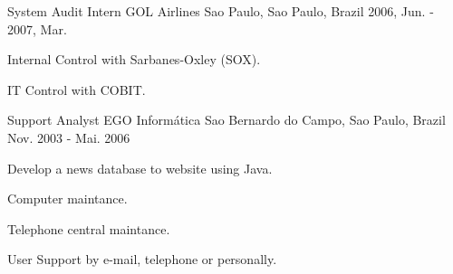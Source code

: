 \begin{cventries}
  \cventry
    {System Audit Intern} %
    {GOL Airlines} %
    {Sao Paulo, Sao Paulo, Brazil} %
    {2006, Jun. - 2007, Mar.} %
    {
      \begin{cvitems} %
        \item {Internal Control with Sarbanes-Oxley (SOX).}
        \item {IT Control with COBIT.}
      \end{cvitems}
    }

  \cventry
    {Support Analyst} %
    {EGO Informática} %
    {Sao Bernardo do Campo, Sao Paulo, Brazil} %
    {Nov. 2003 - Mai. 2006} %
    {
      \begin{cvitems} %
        \item {Develop a news database to website using Java.}
        \item {Computer maintance.}
        \item {Telephone central maintance.}
        \item {User Support by e-mail, telephone or personally.}
      \end{cvitems}
    }

\end{cventries}
